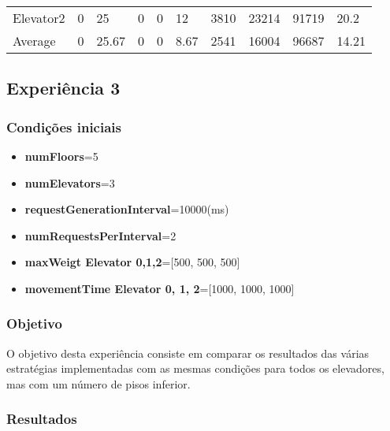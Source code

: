 \documentclass[a4paper]{article}
\begin{document}
\begin{table}[h]
\begin{tabular}{@{}llllllllll@{}}
Elevator2 & 0        & 25            & 0           & 0                                                               & 12                                                                  & 3810                                                         & 23214                                                 & 91719                                                   & 20.2         \\
Average   & 0     & 25.67         & 0        & 0                                                               & 8.67                                                              & 2541                                                         & 16004                                                 &  96687                                                  & 14.21        \\ \bottomrule
\end{tabular}
\end{table}

\subsection{Experiência 3}

\subsubsection{Condições iniciais}

\begin{itemize}
\item \textbf{numFloors}=5
\item \textbf{numElevators}=3
\item \textbf{requestGenerationInterval}=10000(ms)
\item \textbf{numRequestsPerInterval}=2
\item \textbf{maxWeigt Elevator 0,1,2}=[500, 500, 500]
\item \textbf{movementTime Elevator 0, 1, 2}=[1000, 1000, 1000]
\end{itemize}

\subsubsection{Objetivo} 

O objetivo desta experiência consiste em comparar os resultados das várias estratégias implementadas com as mesmas condições para todos os elevadores, mas com um número de pisos inferior.

\subsubsection{Resultados}
\end{document}

